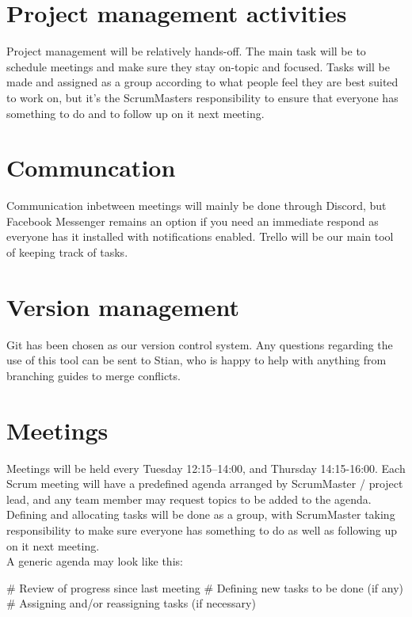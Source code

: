 \documentclass{article}
\begin{document}
\section*{Project management activities}

Project management will be relatively hands-off. The main task will be to schedule meetings and make sure they stay on-topic and focused. Tasks will be made and assigned as a group according to what people feel they are best suited to work on, but it's the ScrumMasters responsibility to ensure that everyone has something to do and to follow up on it next meeting.

\section*{Communcation}

Communication inbetween meetings will mainly be done through Discord, but Facebook Messenger remains an option if you need an immediate respond as everyone has it installed with notifications enabled. Trello will be our main tool of keeping track of tasks.

\section*{Version management}

Git has been chosen as our version control system. Any questions regarding the use of this tool can be sent to Stian, who is happy to help with anything from branching guides to merge conflicts.

\section*{Meetings}

Meetings will be held every Tuesday 12:15--14:00, and Thursday 14:15-16:00. Each Scrum meeting will have a predefined agenda arranged by ScrumMaster / project lead, and any team member may request topics to be added to the agenda. Defining and allocating tasks will be done as a group, with ScrumMaster taking responsibility to make sure everyone has something to do as well as following up on it next meeting.\\

A generic agenda may look like this:\\

\begin{easylist}[enumerate]
    # Review of progress since last meeting
    # Defining new tasks to be done (if any)
    # Assigning and/or reassigning tasks (if necessary)
\end{easylist}
\end{document}
